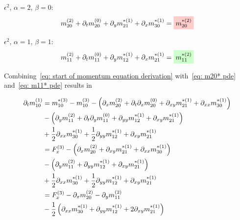 \documentclass{article}
\begin{document}
$\epsilon^2$, $\alpha=2$, $\beta=0$:
\begin{equation}
  \label{eq: m20* pde}
  m_{20}^{(2)} + \partial_t m_{20}^{(0)} + \partial_y m_{21}^{*(1)} + \partial_x m_{30}^{*(1)} = \highlight{m_{20}^{*(2)}}
\end{equation}

$\epsilon^2$, $\alpha=1$, $\beta=1$:
\begin{equation}
  \label{eq: m11* pde}
  m_{11}^{(2)} + \partial_t m_{11}^{(0)} + \partial_y m_{12}^{*(1)} + \partial_x m_{21}^{*(1)} = \highlight[green]{m_{11}^{*(2)}}
\end{equation}

Combining~\eqref{eq: start of momentum equation derivation} with~\eqref{eq: m20* pde} and~\eqref{eq: m11* pde} results in

\begin{align}
  \phantom{\partial_t m_{10}^{(1)}}
  &\begin{aligned}
  \nonumber
    \mathllap{\partial_t m_{10}^{(1)}} & =
    m_{10}^{*(3)} - m_{10}^{(3)}
    - \left(\partial_x m_{20}^{(2)} + \partial_t\partial_x m_{20}^{(0)} + \partial_{xy} m_{21}^{*(1)} + \partial_{xx} m_{30}^{*(1)}\right) \\
    &
    - \left(\partial_y m_{11}^{(2)} + \partial_t\partial_y m_{11}^{(0)} + \partial_{yy} m_{12}^{*(1)} + \partial_{xy} m_{21}^{*(1)}\right) \\
    &
    + \frac{1}{2}\partial_{xx} m_{30}^{*(1)} + \frac{1}{2} \partial_{yy} m_{12}^{*(1)} + \partial_{xy} m_{21}^{*(1)}
  \end{aligned} \\
  &\begin{aligned}
  \nonumber
   & =
    F_x^{(3)}
    - \left(\partial_x m_{20}^{(2)} + \partial_{xy} m_{21}^{*(1)} + \partial_{xx} m_{30}^{*(1)}\right) \\
    &
    - \left(\partial_y m_{11}^{(2)} + \partial_{yy} m_{12}^{*(1)} + \partial_{xy} m_{21}^{*(1)}\right) \\
    &
    + \frac{1}{2}\partial_{xx} m_{30}^{*(1)} + \frac{1}{2} \partial_{yy} m_{12}^{*(1)} + \partial_{xy} m_{21}^{*(1)}
  \end{aligned}\\
%
  &\begin{aligned}
  \nonumber
   & =
    F_x^{(3)}
    - \partial_x m_{20}^{(2)} - \partial_y m_{11}^{(2)}   \\
    &
    - \frac{1}{2} \left(\partial_{xx} m_{30}^{*(1)} + \partial_{yy} m_{12}^{*(1)} + 2\partial_{xy} m_{21}^{*(1)}\right)
  \end{aligned}
\end{align}
\end{document}
